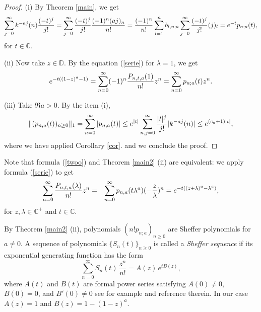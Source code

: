 \documentclass[a4paper,12pt]{amsart}
\def\CC{\mathbb C}
\def\CC{\mathbb C}
\def\DD{\mathbb D}
\theoremstyle{definition}
\theoremstyle{remark}
\begin{document}
\begin{proof} (i) By Theorem \ref{main}, we get
$$
\sum_{j=0}^\infty k^{-aj}(n){(-t)^{j}\over j!}=\sum_{j=0}^\infty{(-t)^{j}\over j!}{(-1)^n (aj)_n\over n!}={(-1)^n\over n!}\sum_{l=1}^n {b_{l,n;a}}\sum_{j=0}^\infty{(-t)^{j}\over j!}(j)_l= e^{-t}p_{n;a}(t),
$$
for $t\in \CC.$

\noindent (ii) Now take $z\in \DD$. By the equation (\ref{serie}) for $\lambda=1$, we get
\begin{eqnarray*}
e^{-t((1-z)^a-1)}=\sum_{n=0}^\infty(-1)^n{P_{n,t,a}(1)\over n!}{z^n}= \sum_{n=0}^\infty p_{n;a}(t)z^n.
\end{eqnarray*}

\noindent (iii) Take $\Re a>0$. By the item (i),
$$
\Vert (p_{n;a}(t))_{n\ge 0}\Vert_1=\sum_{n=0}^\infty \vert p_{n;a}(t)\vert\le  e^{\vert t\vert}\sum_{n,j=0}^\infty {\vert t\vert^j\over j!}\vert k^{-aj}(n)\vert\le e^{(c_a+1)\vert t\vert},
$$
where we have applied Corollary \ref{cor}.
and we conclude the proof.
\end{proof}


 Note that formula (\ref{twoo}) and Theorem \ref{main2} (ii) are equivalent: we apply formula (\ref{serie}) to get
\begin{eqnarray*}
\sum_{n=0}^\infty{P_{n,t,a}(\lambda)\over n!}{z^n} &=&
\sum_{n=0}^\infty p_{n,a}(t\lambda^a)(-{z\over \lambda})^n=
e^{-t((z+\lambda)^a-\lambda^a)},
\end{eqnarray*}
for $z, \lambda \in \CC^+$ and $t\in \CC.$

By Theorem \ref{main2} (ii), polynomials $(n!p_{n;a})_{n\ge 0}$ are Sheffer polynomials for $a\not=0$. A sequence of polynomials
$\{S_n(t)\}_{n\ge 0}$ is called a \emph{Sheffer sequence} if its exponential generating function
has the form
\[
\sum_{n=0}^{\infty} S_n(t)\,\frac{z^n}{n!}
= A(z)\,e^{tB(z)},
\]
where $A(t)$ and $B(t)$ are formal power series satisfying
$A(0)\neq 0$, $B(0)=0$, and $B'(0)\neq 0$ see for example \cite[Introduction]{CG} and reference therein. In our case $A(z)=1$ and $B(z)=1-(1-z)^a$.
\end{document}

